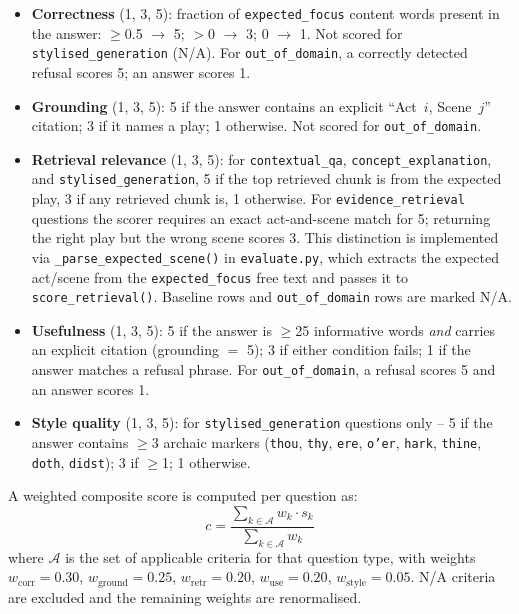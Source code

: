\documentclass[10pt,conference]{IEEEtran}
\begin{document}
\begin{itemize}
    \item \textbf{Correctness} (1, 3, 5): fraction of
        \texttt{expected\_focus} content words present in the answer:
        $\geq$0.5 $\to$ 5; $>$0 $\to$ 3; 0 $\to$ 1. Not scored for
        \texttt{stylised\_generation} (N/A). For
        \texttt{out\_of\_domain}, a correctly detected refusal
        scores 5; an answer scores 1.

    \item \textbf{Grounding} (1, 3, 5): 5 if the answer contains
        an explicit ``Act~$i$, Scene~$j$'' citation; 3 if it names a
        play; 1 otherwise. Not scored for \texttt{out\_of\_domain}.

    \item \textbf{Retrieval relevance} (1, 3, 5): for
        \texttt{contextual\_qa}, \texttt{concept\_explanation}, and
        \texttt{stylised\_generation}, 5 if the top retrieved chunk is
        from the expected play, 3 if any retrieved chunk is, 1
        otherwise. For \texttt{evidence\_retrieval} questions the
        scorer requires an exact act-and-scene match for 5; returning
        the right play but the wrong scene scores 3. This distinction
        is implemented via \verb|_parse_expected_scene()| in
        \verb|evaluate.py|, which extracts the expected act/scene from
        the \texttt{expected\_focus} free text and passes it to
        \verb|score_retrieval()|. Baseline rows and
        \texttt{out\_of\_domain} rows are marked N/A.

    \item \textbf{Usefulness} (1, 3, 5): 5 if the answer is
        $\geq$25 informative words \emph{and} carries an explicit
        citation (grounding $=$ 5); 3 if either condition fails; 1 if
        the answer matches a refusal phrase. For
        \texttt{out\_of\_domain}, a refusal scores 5 and an answer
        scores 1.

    \item \textbf{Style quality} (1, 3, 5): for
        \texttt{stylised\_generation} questions only -- 5 if the
        answer contains $\geq$3 archaic markers (\texttt{thou},
        \texttt{thy}, \texttt{ere}, \texttt{o'er}, \texttt{hark},
        \texttt{thine}, \texttt{doth}, \texttt{didst}); 3 if
        $\geq$1; 1 otherwise.
\end{itemize}

A weighted composite score is computed per question as:
\[
    c = \frac{\displaystyle\sum_{k \in \mathcal{A}} w_k \cdot s_k}
             {\displaystyle\sum_{k \in \mathcal{A}} w_k}
\]
where $\mathcal{A}$ is the set of applicable criteria for that
question type, with weights $w_\text{corr} = 0.30$,
$w_\text{ground} = 0.25$, $w_\text{retr} = 0.20$,
$w_\text{use} = 0.20$, $w_\text{style} = 0.05$.
N/A criteria are excluded and the remaining weights are renormalised.
\end{document}
